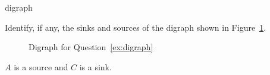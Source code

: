 \begin{defproblem}{digraph}
  \begin{onlyproblem}\label{ex:digraph}
  Identify, if any, the sinks and sources of the digraph shown 
  in Figure~\ref{fig:digraph}. 

  \begin{figure}[tbh]
    \centering
    \par
    \caption{Digraph for Question~\ref{ex:digraph}}
    \label{fig:digraph}
  \end{figure}
  \end{onlyproblem}
  \begin{onlysolution}
  $A$ is a source and $C$ is a sink.
  \end{onlysolution}
\end{defproblem}
